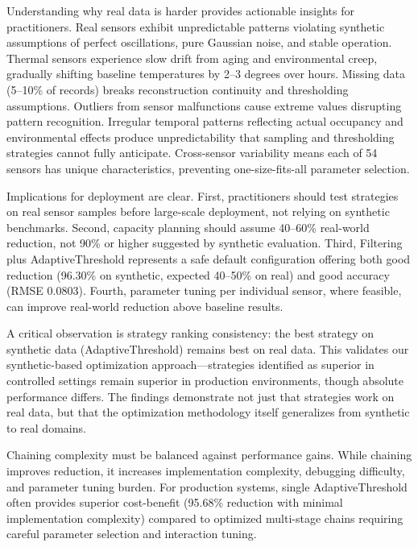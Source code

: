 \documentclass[10pt,twocolumn]{article}
\begin{document}
Understanding why real data is harder provides actionable insights for practitioners. Real sensors exhibit unpredictable patterns violating synthetic assumptions of perfect oscillations, pure Gaussian noise, and stable operation. Thermal sensors experience slow drift from aging and environmental creep, gradually shifting baseline temperatures by 2--3 degrees over hours. Missing data (5--10\% of records) breaks reconstruction continuity and thresholding assumptions. Outliers from sensor malfunctions cause extreme values disrupting pattern recognition. Irregular temporal patterns reflecting actual occupancy and environmental effects produce unpredictability that sampling and thresholding strategies cannot fully anticipate. Cross-sensor variability means each of 54 sensors has unique characteristics, preventing one-size-fits-all parameter selection.

Implications for deployment are clear. First, practitioners should test strategies on real sensor samples before large-scale deployment, not relying on synthetic benchmarks. Second, capacity planning should assume 40--60\% real-world reduction, not 90\% or higher suggested by synthetic evaluation. Third, Filtering plus AdaptiveThreshold represents a safe default configuration offering both good reduction (96.30\% on synthetic, expected 40--50\% on real) and good accuracy (RMSE 0.0803). Fourth, parameter tuning per individual sensor, where feasible, can improve real-world reduction above baseline results.

A critical observation is strategy ranking consistency: the best strategy on synthetic data (AdaptiveThreshold) remains best on real data. This validates our synthetic-based optimization approach---strategies identified as superior in controlled settings remain superior in production environments, though absolute performance differs. The findings demonstrate not just that strategies work on real data, but that the optimization methodology itself generalizes from synthetic to real domains.

Chaining complexity must be balanced against performance gains. While chaining improves reduction, it increases implementation complexity, debugging difficulty, and parameter tuning burden. For production systems, single AdaptiveThreshold often provides superior cost-benefit (95.68\% reduction with minimal implementation complexity) compared to optimized multi-stage chains requiring careful parameter selection and interaction tuning.
\end{document}
